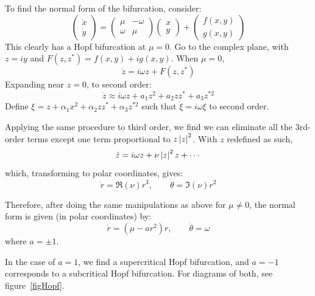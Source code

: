 \documentclass[../Main.tex]{subfiles}
\begin{document}
To find the normal form of the bifurcation, consider:
\begin{equation*}
    \begin{pmatrix}\dot x \\ \dot y\end{pmatrix} = \begin{pmatrix}
        \mu & -\omega \\
        \omega & \mu
    \end{pmatrix}
    \begin{pmatrix}x \\ y\end{pmatrix} + \begin{pmatrix}f(x, y) \\ g(x, y)\end{pmatrix}
\end{equation*}
This clearly has a Hopf bifurcation at $\mu = 0$. Go to the complex plane, with $z = iy$ and $F(z, z^*) = f(x, y) + ig(x, y)$. When $\mu = 0$,
\begin{equation*}
    \dot z = i\omega z + F(z, z^*)
\end{equation*}
Expanding near $z = 0$, to second order:
\begin{equation*}
    \dot z \approx i\omega z + a_1 z^2 + a_2 zz^* + a_3 z^{*2}
\end{equation*}
Define $\xi = z + \alpha_1 x^2 + \alpha_2 zz^* + \alpha_3 z^{*2}$ such that $\dot\xi = i\omega\xi$ to second order.

Applying the same procedure to third order, we find we can eliminate all the 3rd-order terms except one term proportional to $z \left|z\right|^2$. With $z$ redefined as such,
\begin{equation*}
    \dot z = i\omega z + \nu \left|z\right|^2 z + \cdots
\end{equation*}
which, transforming to polar coordinates, gives:
\begin{equation*}
    \dot{r} = \Re(\nu) r^3,\qquad \dot\theta = \Im(\nu) r^2
\end{equation*}

Therefore, after doing the same manipulations as above for $\mu \neq 0$, the normal form is given (in polar coordinates) by:
\begin{equation*}
    \dot{r} = (\mu - a r^2) r,\qquad \dot\theta = \omega
\end{equation*}
where $a = \pm 1$.

In the case of $a = 1$, we find a supercritical Hopf bifurcation, and $a = -1$ corresponds to a subcritical Hopf bifurcation. For diagrams of both, see figure~\ref{figHopf}.
\end{document}
